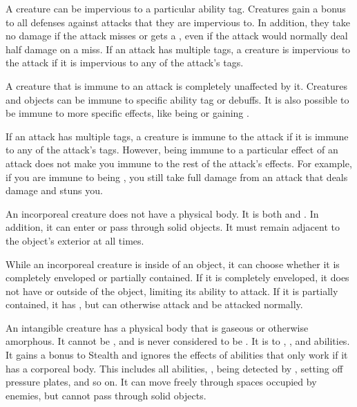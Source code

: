   A creature can be impervious to a particular ability tag.
  Creatures gain a  bonus to all defenses against attacks that they are impervious to.
  In addition, they take no damage if the attack misses or gets a , even if the attack would normally deal half damage on a miss.
  If an attack has multiple tags, a creature is impervious to the attack if it is impervious to any of the attack's tags.

  A creature that is immune to an attack is completely unaffected by it.
  Creatures and objects can be immune to specific ability tag or debuffs.
  It is also possible to be immune to more specific effects, like being \grappled or gaining .

  If an attack has multiple tags, a creature is immune to the attack if it is immune to any of the attack's tags.
  However, being immune to a particular effect of an attack does not make you immune to the rest of the attack's effects.
  For example, if you are immune to being \stunned, you still take full damage from an attack that deals damage and stuns you.

  An incorporeal creature does not have a physical body.
  It is both  and .
  In addition, it can enter or pass through solid objects.
  It must remain adjacent to the object's exterior at all times.

  While an incorporeal creature is inside of an object, it can choose whether it is completely enveloped or partially contained.
  If it is completely enveloped, it does not have  or  outside of the object, limiting its ability to attack.
  If it is partially contained, it has , but can otherwise attack and be attacked normally.

  An intangible creature has a physical body that is gaseous or otherwise amorphous.
  It cannot be , and is never considered to be \squeezing.
  It is  to , \atCreation, and \atManifestation abilities.
  It gains a  bonus to Stealth and ignores the effects of abilities that only work if it has a corporeal body.
  This includes all  abilities, , being detected by , setting off pressure plates, and so on.
  It can move freely through spaces occupied by enemies, but cannot pass through solid objects.

